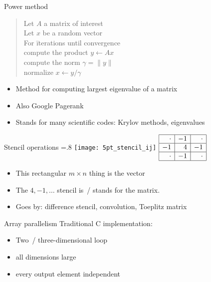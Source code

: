 \documentclass[10pt]{beamer}
\begin{document}
\begin{numberedframe}{Power method}
  \hbox{}
  \begin{quote}
    \begin{tabbing}
      Let $A$ a matrix of interest\\
      Let $x$ be a random vector\\
      For \=iterations until convergence\\
      \> compute the product $y\leftarrow Ax$\\
      \> compute the norm $\gamma=\| y \|$\\
      \> normalize $x\leftarrow y/\gamma$\\
    \end{tabbing}
  \end{quote}
  \begin{itemize}
  \item Method for computing largest eigenvalue of a matrix
  \item Also Google Pagerank
  \item Stands for many scientific codes: Krylov methods, eigenvalues
  \end{itemize}
\end{numberedframe}

\begin{numberedframe}{Stencil operations}
  \hbox{}
  \vbox {\leavevmode \hsize=.8\textwidth
    \hbox{\texttt{[image: 5pt\_stencil\_ij]}}
    \hfill 
    \(
    \begin{array}{|r|r|r|}
      \hline
      \cdot&-1&\cdot\\
      \hline
      -1&4&-1\\
      \hline
      \cdot&-1&\cdot\\
      \hline
    \end{array}
    \)
    \hfill 
    }
  \begin{itemize}
  \item This rectangular $m\times n$ thing is the vector
  \item The $4,-1,\ldots$ stencil is~/ stands for the matrix.
  \item Goes by: difference stencil, convolution, Toeplitz matrix
  \end{itemize}
\end{numberedframe}

\begin{numberedframe}{Array parallelism}
  Traditional C implementation:
  
  \begin{itemize}
  \item Two~/ three-dimensional loop
  \item all dimensions large
  \item every output element independent
  \end{itemize}
\end{numberedframe}
\end{document}

